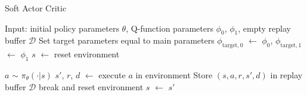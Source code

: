 \begin{algorithm}
\caption{Soft Actor Critic}\label{alg:SAC}
\begin{algorithmic}
    \State{} Input: initial policy parameters $\theta$, Q-function parameters $\phi_0$, $\phi_1$, empty replay buffer $\mathcal{D}$
        \State{} Set target parameters equal to main parameters $\phi_{\text{target}, 0}$ $\leftarrow$ $\phi_0$, $\phi_{\text{target}, 1}$ $\leftarrow$ $\phi_1$ 
        \State{} $s$ $\leftarrow$ reset environment
        
        \State{} $a$ $\sim$ $\pi_\theta(\cdot | s)$
        \State{} $s'$, $r$, $d$ $\leftarrow$ execute $a$ in environment
        \State{} Store $(s, a, r, s', d)$ in replay buffer $\mathcal{D}$
        \State{} break and reset environment
        \EndIf{}
        \State{} $s$ $\leftarrow$ $s'$
        \EndFor{}
        

\end{algorithmic}
\end{algorithm}
